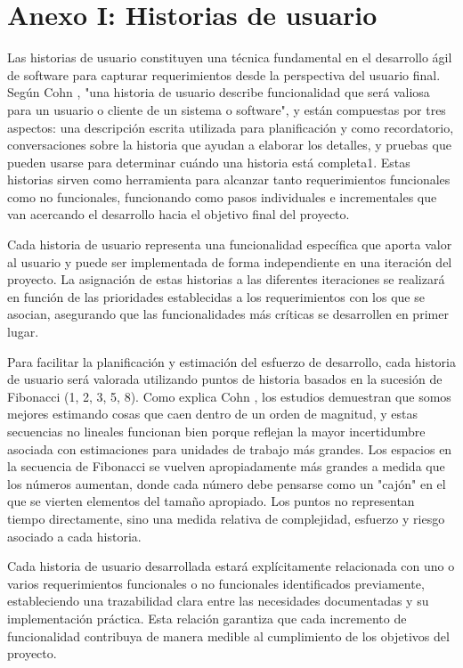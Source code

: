 \section*{Anexo I: Historias de usuario}
{}
\label{sec:anexo-historias-usuario}

Las historias de usuario constituyen una técnica fundamental en el desarrollo
ágil de software para capturar requerimientos desde la perspectiva del usuario
final. Según Cohn \cite{Cohn2004}, "una historia de usuario describe
funcionalidad que será valiosa para un usuario o cliente de un sistema o
software", y están compuestas por tres aspectos: una descripción escrita
utilizada para planificación y como recordatorio, conversaciones sobre la
historia que ayudan a elaborar los detalles, y pruebas que pueden usarse para
determinar cuándo una historia está completa1. Estas historias sirven como
herramienta para alcanzar tanto requerimientos funcionales como no funcionales,
funcionando como pasos individuales e incrementales que van acercando el
desarrollo hacia el objetivo final del proyecto.

Cada historia de usuario representa una funcionalidad específica que aporta
valor al usuario y puede ser implementada de forma independiente en una
iteración del proyecto. La asignación de estas historias a las diferentes
iteraciones se realizará en función de las prioridades establecidas a los
requerimientos con los que se asocian, asegurando que las funcionalidades más
críticas se desarrollen en primer lugar.

Para facilitar la planificación y estimación del esfuerzo de desarrollo, cada
historia de usuario será valorada utilizando puntos de historia basados en la
sucesión de Fibonacci (1, 2, 3, 5, 8). Como explica Cohn \cite{Cohn2005}, los
estudios demuestran que somos mejores estimando cosas que caen dentro de un
orden de magnitud, y estas secuencias no lineales funcionan bien porque
reflejan la mayor incertidumbre asociada con estimaciones para unidades de
trabajo más grandes. Los espacios en la secuencia de Fibonacci se vuelven
apropiadamente más grandes a medida que los números aumentan, donde cada número
debe pensarse como un "cajón" en el que se vierten elementos del tamaño
apropiado. Los puntos no representan tiempo directamente, sino una medida
relativa de complejidad, esfuerzo y riesgo asociado a cada historia.

Cada historia de usuario desarrollada estará explícitamente relacionada con uno
o varios requerimientos funcionales o no funcionales identificados previamente,
estableciendo una trazabilidad clara entre las necesidades documentadas y su
implementación práctica. Esta relación garantiza que cada incremento de
funcionalidad contribuya de manera medible al cumplimiento de los objetivos del
proyecto.

